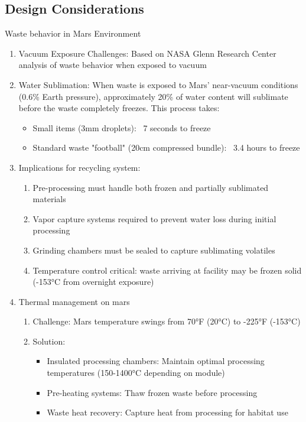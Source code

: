 \documentclass[12pt, a4paper]{article}
\begin{document}
\subsection{Design Considerations}
Waste behavior in Mars Environment
\begin{enumerate}
    \item Vacuum Exposure Challenges: Based on NASA Glenn Research Center analysis of waste behavior when exposed to vacuum
    \item Water Sublimation: When waste is exposed to Mars' near-vacuum conditions (0.6\% Earth pressure), approximately 20\% of water content will sublimate before the waste completely freezes. This process takes:
    \begin{itemize}
        \item Small items (3mm droplets): ~7 seconds to freeze
        \item Standard waste "football" (20cm compressed bundle): ~3.4 hours to freeze
    \end{itemize}
    \item Implications for recycling system:
    \begin{enumerate}
        \item Pre-processing must handle both frozen and partially sublimated materials
        \item Vapor capture systems required to prevent water loss during initial processing
        \item Grinding chambers must be sealed to capture sublimating volatiles
        \item Temperature control critical: waste arriving at facility may be frozen solid (-153°C from overnight exposure)
    \end{enumerate}
    \item Thermal management on mars
    \begin{enumerate}
        \item Challenge: Mars temperature swings from 70°F (20°C) to -225°F (-153°C)
        \item Solution:
        \begin{itemize}
            \item Insulated processing chambers: Maintain optimal processing temperatures (150-1400°C depending on module)
            \item Pre-heating systems: Thaw frozen waste before processing
            \item Waste heat recovery: Capture heat from processing for habitat use

\end{itemize}
\end{enumerate}
\end{enumerate}
\end{document}
